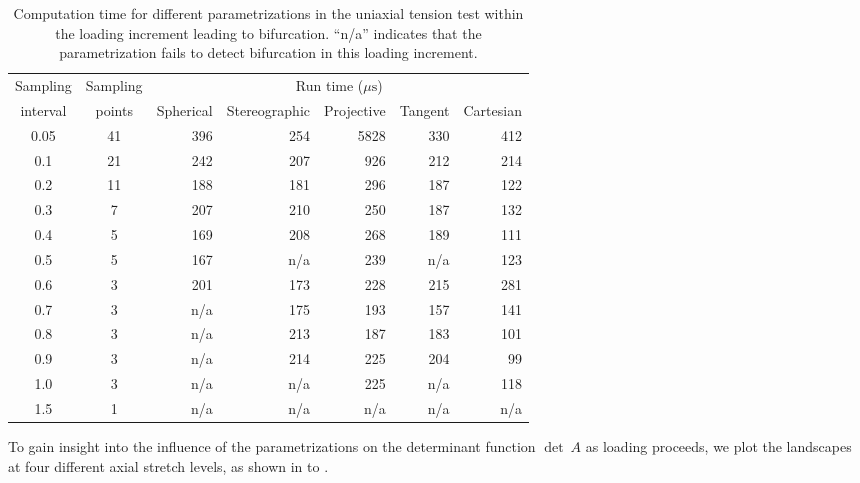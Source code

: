 \documentclass[12pt]{article}
\numberwithin{equation}{section}
\begin{document}
\begin{table}[htbp]
  \begin{center}
    \begin{tabular}{c c | r r r r r}
      \toprule
      Sampling & Sampling & \multicolumn{5}{c}{Run time ($\mu\text{s}$)} \\
      interval  & points  & Spherical & Stereographic & Projective &
      Tangent & Cartesian \\
      \midrule
      0.05  &  41  &  396  & 254  &  5828  &  330  &  412   \\
      0.1  &  21  &  242  & 207  &  926   &  212  &  214   \\
      0.2  &  11  &  188  & 181  &  296   &  187  &  122   \\
      0.3  &  7  &  207  & 210  &  250   &  187  &  132   \\
      0.4  &  5  &  169  & 208  &  268   &  189  &  111   \\
      0.5  &  5  &	 167  & n/a  &  239   &  n/a   &  123   \\
      0.6  &  3  &	 201  & 173  &  228   &  215  &  281   \\
      0.7  &  3  &	 n/a  & 175 	  &  193   &  157  &  141   \\
      0.8  &  3  &  n/a  & 213  &  187   &  183  &  101   \\
      0.9  &  3  &	 n/a  & 214  &  225   &  204  &  99   \\
      1.0  &  3  &  n/a  & n/a	  &  225   &  n/a   &  118   \\
      1.5  &  1  &	 n/a  & n/a	  &  n/a   &  n/a   &  n/a   \\
      \bottomrule
    \end{tabular}
    \caption{Computation time for different parametrizations in the
      uniaxial tension test within the loading increment leading to
      bifurcation.  ``n/a'' indicates that the parametrization fails
      to detect bifurcation in this loading increment.}
    \label{tab:aniso_uniaxial_runtime}
  \end{center}
\end{table}

To gain insight into the influence of the parametrizations on the
determinant function $\det~A$ as loading proceeds, we plot the
landscapes at four different axial stretch levels, as shown in
 to .
\end{document}
